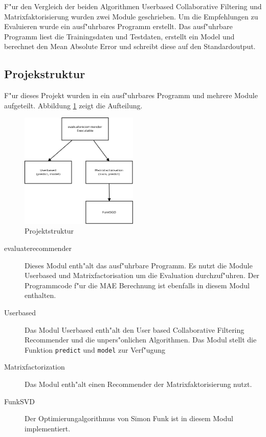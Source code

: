 \documentclass[a4paper, 12pt]{article}
\begin{document}
F"ur den Vergleich der beiden Algorithmen Userbased Collaborative Filtering und Matrixfaktorisierung wurden zwei Module geschrieben. Um die Empfehlungen zu Evaluieren wurde ein ausf"uhrbares Programm erstellt. Das ausf"uhrbare Programm liest die Trainingsdaten und Testdaten, erstellt ein Model und berechnet den Mean Absolute Error und schreibt diese auf den Standardoutput.


\subsection{Projekstruktur}
\label{sec:structur}

F"ur dieses Projekt wurden in ein ausf"uhrbares Programm und mehrere Module aufgeteilt. Abbildung \ref{fig:structur} zeigt die Aufteilung.

\begin{figure}
  \centering
      \includegraphics[width=0.5\textwidth]{structur}
  \caption{Projektstruktur}
  \label{fig:structur}
\end{figure}

\begin{description}
\item[evaluaterecommender] Dieses Modul enth"alt das ausf"uhrbare Programm. Es nutzt die Module Userbased und Matrixfactorisation um die Evaluation durchzuf"uhren. Der Programmcode f"ur die MAE Berechnung ist ebenfalls in diesem Modul enthalten.
\item[Userbased] Das Modul Userbased enth"alt den User based Collaborative Filtering Recommender und die unpers"onlichen Algorithmen. Das Modul stellt die Funktion \verb|predict| und \verb|model| zur Verf"ugung
\item[Matrixfactorization] Das Modul enth"alt einen Recommender der Matrixfaktorisierung nutzt.
\item[FunkSVD] Der Optimierungalgorithmus von Simon Funk ist in diesem Modul implementiert.
\end{description}
\end{document}
